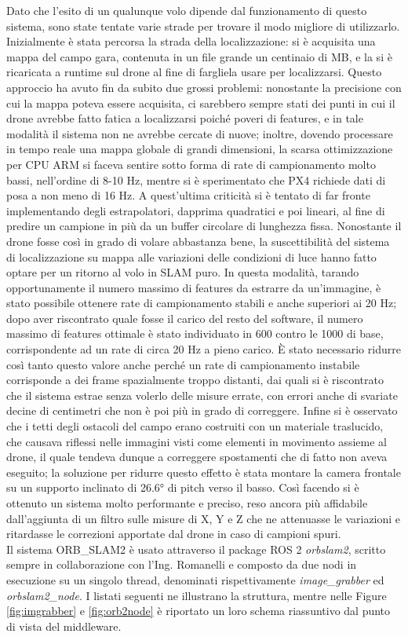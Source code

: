 Dato che l'esito di un qualunque volo dipende dal funzionamento di questo sistema, sono state tentate varie strade per trovare il modo migliore di utilizzarlo. Inizialmente è stata percorsa la strada della localizzazione: si è acquisita una mappa del campo gara, contenuta in un file grande un centinaio di MB, e la si è ricaricata a runtime sul drone al fine di fargliela usare per localizzarsi. Questo approccio ha avuto fin da subito due grossi problemi: nonostante la precisione con cui la mappa poteva essere acquisita, ci sarebbero sempre stati dei punti in cui il drone avrebbe fatto fatica a localizzarsi poiché poveri di features, e in tale modalità il sistema non ne avrebbe cercate di nuove; inoltre, dovendo processare in tempo reale una mappa globale di grandi dimensioni, la scarsa ottimizzazione per CPU ARM si faceva sentire sotto forma di rate di campionamento molto bassi, nell'ordine di 8-10 Hz, mentre si è sperimentato che PX4 richiede dati di posa a non meno di 16 Hz. A quest'ultima criticità si è tentato di far fronte implementando degli estrapolatori, dapprima quadratici e poi lineari, al fine di predire un campione in più da un buffer circolare di lunghezza fissa. Nonostante il drone fosse così in grado di volare abbastanza bene, la suscettibilità del sistema di localizzazione su mappa alle variazioni delle condizioni di luce hanno fatto optare per un ritorno al volo in SLAM puro. In questa modalità, tarando opportunamente il numero massimo di features da estrarre da un'immagine, è stato possibile ottenere rate di campionamento stabili e anche superiori ai 20 Hz; dopo aver riscontrato quale fosse il carico del resto del software, il numero massimo di features ottimale è stato individuato in 600 contro le 1000 di base, corrispondente ad un rate di circa 20 Hz a pieno carico. È stato necessario ridurre così tanto questo valore anche perché un rate di campionamento instabile corrisponde a dei frame spazialmente troppo distanti, dai quali si è riscontrato che il sistema estrae senza volerlo delle misure errate, con errori anche di svariate decine di centimetri che non è poi più in grado di correggere. Infine si è osservato che i tetti degli ostacoli del campo erano costruiti con un materiale traslucido, che causava riflessi nelle immagini visti come elementi in movimento assieme al drone, il quale tendeva dunque a correggere spostamenti che di fatto non aveva eseguito; la soluzione per ridurre questo effetto è stata montare la camera frontale su un supporto inclinato di 26.6° di pitch verso il basso. Così facendo si è ottenuto un sistema molto performante e preciso, reso ancora più affidabile dall'aggiunta di un filtro sulle misure di X, Y e Z che ne attenuasse le variazioni e ritardasse le correzioni apportate dal drone in caso di campioni spuri.\\
Il sistema ORB\_SLAM2 è usato attraverso il package ROS 2 \emph{orbslam2}, scritto sempre in collaborazione con l'Ing. Romanelli e composto da due nodi in esecuzione su un singolo thread, denominati rispettivamente \emph{image\_grabber} ed \emph{orbslam2\_node}. I listati seguenti ne illustrano la struttura, mentre nelle Figure \ref{fig:imgrabber} e \ref{fig:orb2node} è riportato un loro schema riassuntivo dal punto di vista del middleware.

